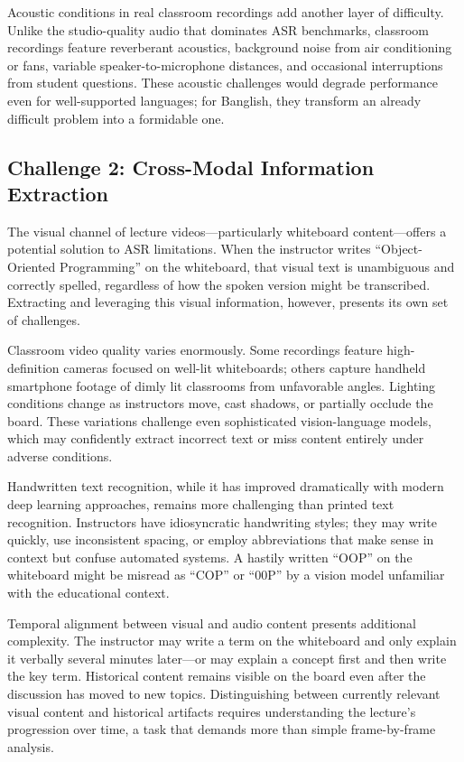 Acoustic conditions in real classroom recordings add another layer of difficulty. Unlike the studio-quality audio that dominates ASR benchmarks, classroom recordings feature reverberant acoustics, background noise from air conditioning or fans, variable speaker-to-microphone distances, and occasional interruptions from student questions. These acoustic challenges would degrade performance even for well-supported languages; for Banglish, they transform an already difficult problem into a formidable one.

\subsection{Challenge 2: Cross-Modal Information Extraction}

The visual channel of lecture videos---particularly whiteboard content---offers a potential solution to ASR limitations. When the instructor writes ``Object-Oriented Programming'' on the whiteboard, that visual text is unambiguous and correctly spelled, regardless of how the spoken version might be transcribed. Extracting and leveraging this visual information, however, presents its own set of challenges.

Classroom video quality varies enormously. Some recordings feature high-definition cameras focused on well-lit whiteboards; others capture handheld smartphone footage of dimly lit classrooms from unfavorable angles. Lighting conditions change as instructors move, cast shadows, or partially occlude the board. These variations challenge even sophisticated vision-language models, which may confidently extract incorrect text or miss content entirely under adverse conditions.

Handwritten text recognition, while it has improved dramatically with modern deep learning approaches, remains more challenging than printed text recognition. Instructors have idiosyncratic handwriting styles; they may write quickly, use inconsistent spacing, or employ abbreviations that make sense in context but confuse automated systems. A hastily written ``OOP'' on the whiteboard might be misread as ``COP'' or ``00P'' by a vision model unfamiliar with the educational context.

Temporal alignment between visual and audio content presents additional complexity. The instructor may write a term on the whiteboard and only explain it verbally several minutes later---or may explain a concept first and then write the key term. Historical content remains visible on the board even after the discussion has moved to new topics. Distinguishing between currently relevant visual content and historical artifacts requires understanding the lecture's progression over time, a task that demands more than simple frame-by-frame analysis.

